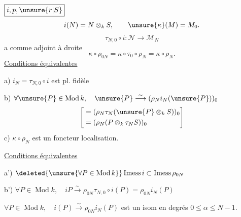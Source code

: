 \(\boxed{i,p,\unsure{r|S}}\)
\[
i(N)=N\otimes_kS,\qquad\unsure{\kappa}(M)=M_0.
\]
\[
\tau_{N,0}\circ i:\mathcal N\longrightarrow\mathcal M_N
\]
a comme adjoint à droite
\[
\kappa\circ\rho_{0N}=\kappa\circ\tau_0\circ\rho_N=\kappa\circ\rho_N.
\]
\uline{Conditions équivalentes}

 a) \(i_N=\tau_{N,0}\circ i\) est pl. fidèle

 b) \(\forall\unsure{P}\in\operatorname{Mod}k,\quad
 \unsure{P}\overset\sim\longrightarrow(\rho_Ni_N(\unsure{P}))_0\)
\[
\left[\begin{aligned}
&=(\rho_N\tau_N(\unsure{P}\otimes_k S))_0\\
&=(\rho_N(P\otimes_k\tau_NS))_0
\end{aligned}\right]
\]
 c) \(\kappa\circ\rho_N\) est un foncteur localisation.


\uline{Conditions équivalentes}

 a') \(\deleted{\unsure{\forall P\in\operatorname{Mod}k}}
 \operatorname{Imess}i\subset\operatorname{Imess}\rho_{0N}\)

 b') \(\forall P\in\operatorname{Mod}k,\quad
 iP\overset\sim\longrightarrow\rho_{0N}\tau_{N,0}\circ i(P)
 =\rho_{0N}i_N(P)\)

  \(\forall P\in\operatorname{Mod}k,\quad
 i(P)\overset\sim\longrightarrow\rho_{0N}i_N(P)\) est un isom en degrés
 \(0\leq\alpha\leq N-1\).

